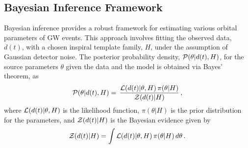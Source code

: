 \documentclass[aps,prd,twocolumn,superscriptaddress,groupedaddress,nofootinbib,showpacs,eqsecnum,useAms]{revtex4-2}
\begin{document}
\subsection{ Bayesian Inference Framework} \label{sec:analysis_techniques}

Bayesian inference provides a robust framework for estimating various orbital parameters of GW events.  This approach involves fitting the observed data, $d(t)$, with a chosen inspiral template family, $H$, under the assumption of Gaussian detector noise. The posterior probability density, ${\cal P}(\theta | d(t), H)$, for the source parameters $\theta$ given the data and the model is obtained via Bayes' theorem, as
\begin{equation}
{\cal P}(\theta | d(t),H) = \, \frac{{\cal L}(d(t) | \theta,H) \, \pi(\theta | H)}{{\cal Z}(d(t) | H)} \,, \label{eq:bayes_theorem}
\end{equation}
where ${\cal L}(d(t) | \theta, H)$ is the likelihood function, $\pi(\theta | H)$ is the prior distribution for the parameters, and ${\cal Z}(d(t) | H)$ is the Bayesian evidence given by
\begin{equation}
{\cal Z}(d(t) | H) = \int {\cal L}(d(t) | \theta,H) \, \pi(\theta | H) \, d\theta \label{eq:evidence}\,.
\end{equation}
\end{document}
